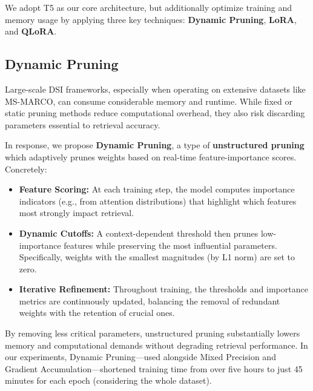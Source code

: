 We adopt T5 as our core architecture, but additionally optimize training and memory usage by applying three key techniques: \textbf{Dynamic Pruning}, \textbf{LoRA}, and \textbf{QLoRA}.

\subsection{Dynamic Pruning}
Large-scale DSI frameworks, especially when operating on extensive datasets like MS-MARCO, can consume considerable memory and runtime. While fixed or static pruning methods reduce computational overhead, they also risk discarding parameters essential to retrieval accuracy.

In response, we propose \textbf{Dynamic Pruning}, a type of \textbf{unstructured pruning} which adaptively prunes weights based on real-time feature-importance scores. Concretely:
\begin{itemize}
    \item \textbf{Feature Scoring:} At each training step, the model computes importance indicators (e.g., from attention distributions) that highlight which features most strongly impact retrieval.
    \item \textbf{Dynamic Cutoffs:} A context-dependent threshold then prunes low-importance features while preserving the most influential parameters. Specifically, weights with the smallest magnitudes (by L1 norm) are set to zero.
    \item \textbf{Iterative Refinement:} Throughout training, the thresholds and importance metrics are continuously updated, balancing the removal of redundant weights with the retention of crucial ones.
\end{itemize}
By removing less critical parameters, unstructured pruning substantially lowers memory and computational demands without degrading retrieval performance. In our experiments, Dynamic Pruning—used alongside Mixed Precision and Gradient Accumulation—shortened training time from over five hours to just 45 minutes for each epoch (considering the whole dataset). 

